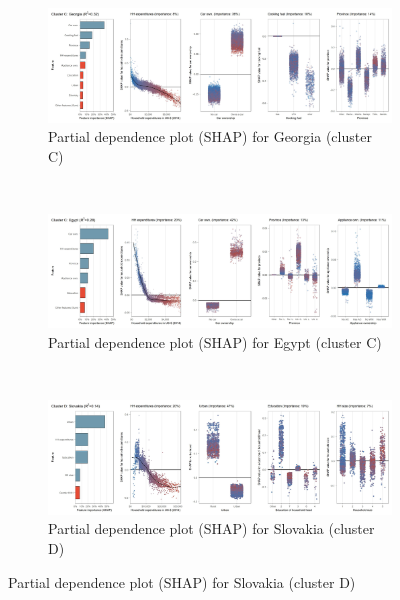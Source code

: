 \begin{figure}[ht!]\ContinuedFloat
    \centering
   \begin{subfigure}[b]{\textwidth}
         \centering
         \caption{Partial dependence plot (SHAP) for Georgia (cluster C)}
         \label{fig:5b_GEO}
         \includegraphics[width=\textwidth]{Figure 5b/Figure_5b_GEO}         
     \end{subfigure}
    \\
    \vspace{0.5cm}
   \begin{subfigure}[b]{\textwidth}
         \centering
         \caption{Partial dependence plot (SHAP) for Egypt (cluster C)}
         \label{fig:5b_EGY}
         \includegraphics[width=\textwidth]{Figure 5b/Figure_5b_EGY}         
     \end{subfigure}
    \\
    \vspace{0.5cm}
   \begin{subfigure}[b]{\textwidth}
         \centering
         \caption{Partial dependence plot (SHAP) for Slovakia (cluster D)}
         \label{fig:5b_SVK}
         \includegraphics[width=\textwidth]{Figure 5b/Figure_5b_SVK}

\end{subfigure}
\end{figure}

